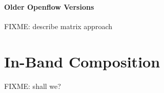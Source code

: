 \documentclass[conference]{sigcomm-alternate}
\begin{document}
\paragraph{Older Openflow Versions} FIXME: describe matrix approach

\section{In-Band Composition}\label{sec:compo}

FIXME: shall we?

\begin{comment}

\section{Transactions in Openflow}\label{sec:sync}

Multi-write and read-modify transactions.

\subsection{Dealing with multiple updates}

TBD - adding the notion of versions and cleanup/GC. probably no good way to solve infinite versions... maybe check literature on shared memory and multiple writes.


\subsection{Improving the scheme with check-overlap}\label{sec:todo}

Till now we considered a model that allows multiple updates to match-action entries. Here we extends the model with actions create-entry and delete-entry that may failed and abort the whole transaction depending on the existence on non-existence of specific entries prior to the action.

Next we show how such actions can be used to implement consensus with much less resources. We use entry id as a property used to reference specific entry.

\section{Applications and ramifications}\label{sec:application}




\end{comment}
\end{document}
